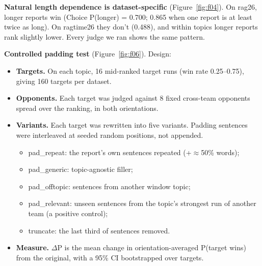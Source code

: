 \documentclass[
  10pt,
]{article}
\providecommand{\tightlist}{%
  \setlength{\itemsep}{0pt}\setlength{\parskip}{0pt}}
\begin{document}
\textbf{Natural length dependence is dataset-specific}
(Figure~\ref{fig:f04}). On rag26, longer reports win (Choice P(longer) =
0.700; 0.865 when one report is at least twice as long). On ragtime26
they don't (0.488), and within topics longer reports rank slightly
lower. Every judge we ran shows the same pattern.

\textbf{Controlled padding test} (Figure~\ref{fig:f06}). Design:

\begin{itemize}
\tightlist
\item
  \textbf{Targets.} On each topic, 16 mid-ranked target runs (win rate
  0.25--0.75), giving 160 targets per dataset.
\item
  \textbf{Opponents.} Each target was judged against 8 fixed cross-team
  opponents spread over the ranking, in both orientations.
\item
  \textbf{Variants.} Each target was rewritten into five variants.
  Padding sentences were interleaved at seeded random positions, not
  appended.

  \begin{itemize}
  \tightlist
  \item
    pad\_repeat: the report's own sentences repeated
    (+\ensuremath{\approx}50\% words);
  \item
    pad\_generic: topic-agnostic filler;
  \item
    pad\_offtopic: sentences from another window topic;
  \item
    pad\_relevant: unseen sentences from the topic's strongest run of
    another team (a positive control);
  \item
    truncate: the last third of sentences removed.
  \end{itemize}
\item
  \textbf{Measure.} \ensuremath{\Delta}P is the mean change in
  orientation-averaged P(target wins) from the original, with a 95\% CI
  bootstrapped over targets.
\end{itemize}
\end{document}
